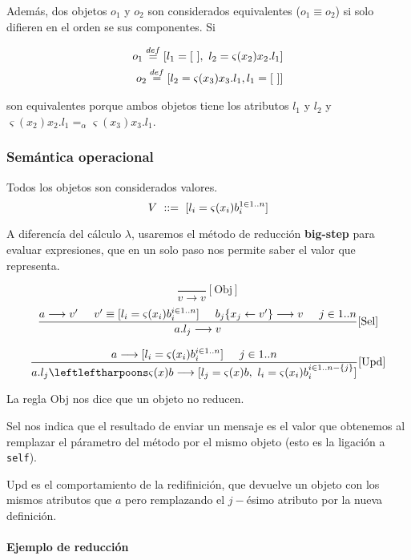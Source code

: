 Además, dos objetos $o_1$ y $o_2$ son considerados equivalentes ($o_1 \equiv o_2$) si solo difieren en el orden se sus componentes. Si 

\begin{align*}
	o_1 \overset{def}{=} [l_1 = [~],~l_2 = \varsigma(x_2)x_2.l_1] \\
	o_2 \overset{def}{=} [l_2 = \varsigma(x_3)x_3.l_1, l_1 = [~]]
\end{align*}

son equivalentes porque ambos objetos tiene los atributos $l_1$ y $l_2$ y $\varsigma(x_2) x_2.l_1 =_\alpha \varsigma(x_3) x_3.l_1$.


\subsubsection{Semántica operacional}
Todos los objetos son considerados valores.
$$V~::=~[l_i = \varsigma(x_i)b_i^{1\in 1..n}]$$

A diferencía del cálculo $\lambda$, usaremos el método de reducción \textbf{big-step} para evaluar expresiones, que en un solo paso nos permite saber el valor que representa.

$$\frac{}{v\longrightarrow v}[\text{Obj}]$$
\vspace*{5mm}
$$\frac{a\longrightarrow v'\hspace*{5mm} v'\equiv [l_i = \varsigma(x_i)b_i^{i\in 1..n}]\hspace*{5mm} b_j\{x_j\leftarrow v'\}\longrightarrow v\hspace*{5mm} j\in1..n}{a.l_j\longrightarrow v}[\text{Sel}]$$

\vspace*{5mm}
$$\frac{a\longrightarrow [\OOAtributo{l_i}{x_i}{b_i}^{i\in 1..n}]\hspace*{5mm} j\in1..n}{\OORedefinicion{a.l_j}{x}{b}\longrightarrow [\OOAtributo{l_j}{x}{b},~\OOAtributo{l_i}{x_i}{b_i}^{i\in 1..n-\{j\}}]}[\text{Upd}]$$


La regla Obj nos dice que un objeto no reducen.

Sel nos indica que el resultado de enviar un mensaje es el valor que obtenemos al remplazar el párametro del método por el mismo objeto (esto es la ligación a \texttt{self}).

Upd es el comportamiento de la redifinición, que devuelve un objeto con los mismos atributos que $a$ pero remplazando el $j-$ésimo atributo por la nueva definición.


\paragraph{Ejemplo de reducción}

